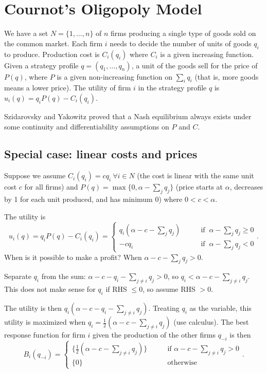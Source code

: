 \documentclass[12pt,letterpaper]{report}
\begin{document}
\section{Cournot's Oligopoly Model}

We have a set $N = \{1, \ldots, n\}$ of $n$ firms producing a single type of goods sold on the
common market.
Each firm $i$ needs to decide the number of units of goods $q_i$ to produce.
Production cost is $C_i(q_i)$ where $C_i$ is a given increasing function.
Given a strategy profile $q = (q_1, \ldots, q_n)$, a unit of the goods sell for the price of $P(q)$,
where $P$ is a given non-increasing function on $\sum_i q_i$ (that is, more goods means a
lower price).
The utility of firm $i$ in the strategy profile $q$ is $u_i(q) = q_i P(q) - C_i(q_i)$.

Szidarovsky and Yakowitz proved that a Nash equilibrium always exists under some continuity and
differentiability assumptions on $P$ and $C$.

\subsection{Special case: linear costs and prices}

Suppose we assume $C_i(q_i) = c q_i \ \forall i \in N$ (the cost is linear with the same unit cost
$c$ for all firms) and $P(q) = \max\{0, \alpha - \sum_j q_j\}$ (price starts at $\alpha$,
decreases by 1 for each unit produced, and has minimum 0) where $0 < c < \alpha$.

The utility is
\[
  u_i(q) = q_i P(q) - C_i(q_i) = \begin{cases}
    q_i (\alpha - c - \sum_j q_j) \qquad &\text{if } \ \alpha - \sum_j q_j \geq 0 \\
    -c q_i &\text{if } \ \alpha - \sum_j q_j < 0
  \end{cases}.
\]
When is it possible to make a profit?
When $\alpha - c - \sum_j q_j > 0$.

Separate $q_i$ from the sum: $\alpha - c - q_i - \sum_{j \neq i} q_j > 0$, so
$q_i < \alpha - c - \sum_{j \neq i} q_j$.
This does not make sense for $q_i$ if RHS $\leq 0$, so assume RHS $> 0$.

The utility is then $q_i(\alpha - c - q_i - \sum_{j \neq i} q_j)$.
Treating $q_i$ as the variable, this utility is maximized when
$q_i = \frac{1}{2}(\alpha - c - \sum_{j \neq i} q_j)$ (use calculus).
The best response function for firm $i$ given the production of the other firms $q_{-i}$ is then
\[
  B_i(q_{-i}) = \begin{cases}
    \{ \frac{1}{2} (\alpha - c - \sum_{j \neq i} q_j) \}
      \qquad &\text{if } \alpha - c - \sum_{j \neq i} q_j > 0 \\
    \{ 0 \} &\text{otherwise}
  \end{cases}.
\]
\end{document}
